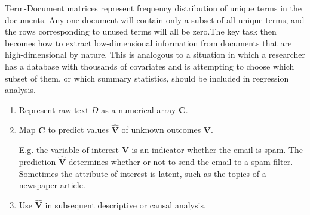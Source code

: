 \documentclass[12pt,a4paper,notitlepage]{article}
\begin{document}
Term-Document matrices represent frequency distribution of unique terms in the documents. Any one document will contain only a subset of all unique terms, and the rows corresponding to unused terms will all be zero.The key task then becomes how to extract low-dimensional information from documents that are high-dimensional by nature. This is analogous to a situation in which a researcher has a database with thousands of covariates and is attempting to choose which subset of them, or which summary statistics, should be included in regression analysis.

\begin{enumerate}
	\item Represent raw text $D$ as a numerical array $\boldsymbol{C}$. 
	 
	\item Map $\boldsymbol{C}$ to predict values $\boldsymbol{\hat{V}}$ of unknown outcomes $\boldsymbol{V}$. 
	
	E.g. the variable of interest $\boldsymbol{V}$ is an indicator whether the email is spam. The prediction $\boldsymbol{\hat{V}}$ determines whether or not to send the email to a spam filter. Sometimes the attribute of interest is latent, such as the topics of a newspaper article.
	\item Use $\boldsymbol{\hat{V}}$ in subsequent descriptive or causal analysis.
\end{enumerate}
\end{document}
